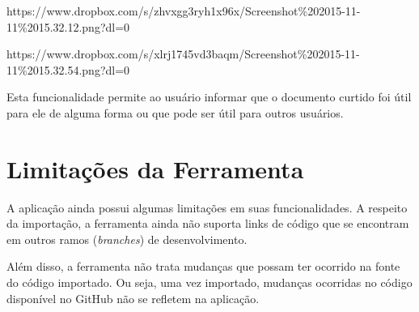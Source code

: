 https://www.dropbox.com/s/zhvxgg3ryh1x96x/Screenshot\%202015-11-11\%2015.32.12.png?dl=0

https://www.dropbox.com/s/xlrj1745vd3baqm/Screenshot\%202015-11-11\%2015.32.54.png?dl=0

Esta funcionalidade permite ao usuário informar que o documento curtido foi útil para ele de alguma forma ou que pode ser útil para outros usuários.

\section{Limitações da Ferramenta}

A aplicação ainda possui algumas limitações em suas funcionalidades. A respeito da importação, a ferramenta ainda não suporta links de código que se encontram em outros ramos (\textit{branches}) de desenvolvimento.

Além disso, a ferramenta não trata mudanças que possam ter ocorrido na fonte do código importado. Ou seja, uma vez importado, mudanças ocorridas no código disponível no GitHub não se refletem na aplicação.

